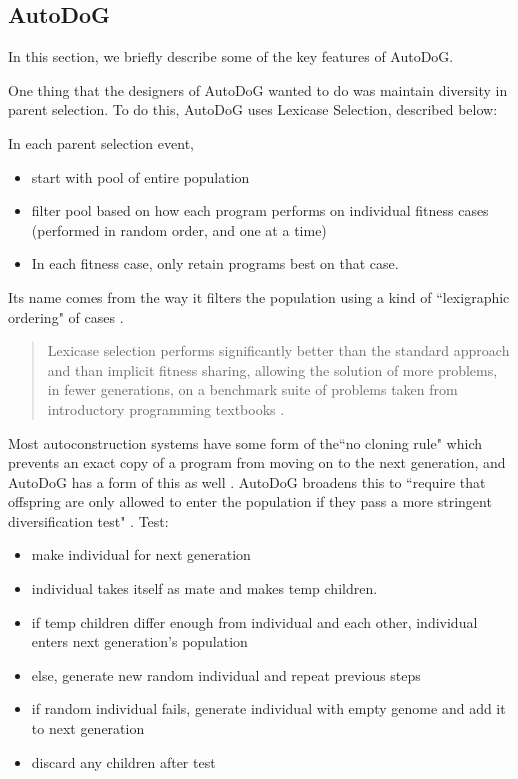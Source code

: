 \documentclass{sig-alternate}
\begin{document}

\subsection{AutoDoG}
\label{sec:autodog}
In this section, we briefly describe some of the key features of AutoDoG.

One thing that the designers of AutoDoG wanted to do was maintain diversity in parent selection. To do this, AutoDoG uses Lexicase Selection, described below:

In each parent selection event,
\begin{itemize}
	\item start with pool of entire population
	\item filter pool based on how each program performs on individual fitness cases (performed in random order, and one at a time)
	\item In each fitness case, only retain programs best on that case.
\end{itemize}


Its name comes from the way it filters the population using a kind of ``lexigraphic ordering" of cases \cite{spector:2016}.
\begin{quotation}
	Lexicase selection performs significantly better than the standard approach and than implicit fitness sharing, allowing the solution of more problems, in fewer generations, on a benchmark suite of problems taken from introductory programming textbooks \cite{spector:2016}.
\end{quotation}

Most autoconstruction systems have some form of the``no cloning rule" which prevents an exact copy of a program from moving on to the next generation, and AutoDoG has a form of this as well \cite{spector:2016}. AutoDoG broadens this to ``require that offspring are only allowed to enter the population if they pass a more stringent diversification test" \cite{spector:2016}.
Test:
\begin{itemize}
	\item make individual for next generation
	\item individual takes itself as mate and makes temp children.
	\item if temp children differ enough from individual and each other, individual enters next generation's population
	\item else, generate new random individual and repeat previous steps
	\item if random individual fails, generate individual with empty genome and add it to next generation
	\item discard any children after test
\end{itemize}
\end{document}
